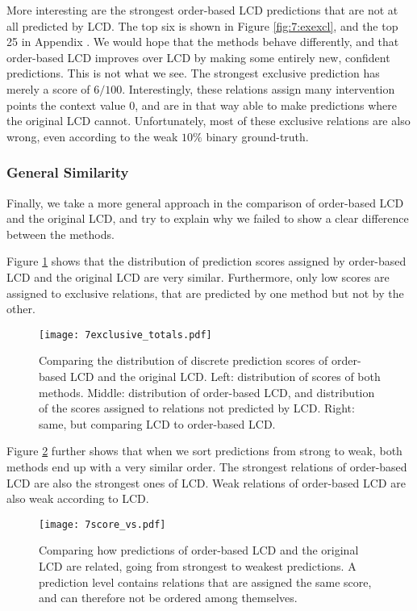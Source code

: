 More interesting are the strongest order-based LCD predictions that are not at all predicted by LCD. The top six is shown in Figure \ref{fig:7:exexcl}, and the top 25 in Appendix . We would hope that the methods behave differently, and that order-based LCD improves over LCD by making some entirely new, confident predictions. This is not what we see. The strongest exclusive prediction has merely a score of $6/100$. Interestingly, these relations assign many intervention points the context value $0$, and are in that way able to make predictions where the original LCD cannot. Unfortunately, most of these exclusive relations are also wrong, even according to the weak $10\%$ binary ground-truth. 


\subsubsection{General Similarity}

Finally, we take a more general approach in the comparison of order-based LCD and the original LCD, and try to explain why we failed to show a clear difference between the methods. 

Figure \ref{fig:7:excltotals} shows that the distribution of prediction scores assigned by order-based LCD and the original LCD are very similar. Furthermore, only low scores are assigned to exclusive relations, that are predicted by one method but not by the other. 

\begin{figure}[h]
    \centering
    \texttt{[image: 7exclusive\_totals.pdf]}
    \caption{Comparing the distribution of discrete prediction scores of order-based LCD and the original LCD. Left: distribution of scores of both methods. Middle: distribution of order-based LCD, and distribution of the scores assigned to relations not predicted by LCD. Right: same, but comparing LCD to order-based LCD.}
    \label{fig:7:excltotals}
\end{figure}

Figure \ref{fig:7:scorevs} further shows that when we sort predictions from strong to weak, both methods end up with a very similar order. The strongest relations of order-based LCD are also the strongest ones of LCD. Weak relations of order-based LCD are also weak according to LCD. 

\begin{figure}[h]
    \centering
    \texttt{[image: 7score\_vs.pdf]}
    \caption{Comparing how predictions of order-based LCD and the original LCD are related, going from strongest to weakest predictions. A prediction level contains relations that are assigned the same score, and can therefore not be ordered among themselves.}
    \label{fig:7:scorevs}
\end{figure}


